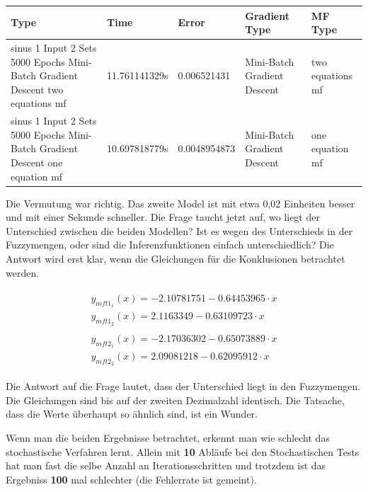 \begin{center}\label{tab2_1000MB}
	\begin{tabular}{ | p{3cm} | l | l | p{3cm} | p{3cm} |}
		\hline
		Type & Time & Error & Gradient Type & MF Type \\ \hline
		sinus 1 Input 2 Sets 5000 Epochs Mini-Batch Gradient Descent two equations mf&11.761141329s&0.006521431&Mini-Batch Gradient Descent&two equations mf \\ \hline
		sinus 1 Input 2 Sets 5000 Epochs Mini-Batch Gradient Descent one equation mf&10.697818779s&0.0048954873&Mini-Batch Gradient Descent&one equation mf \\ \hline
	\end{tabular}
\end{center}

Die Vermutung war richtig. Das zweite Model ist mit etwa 0,02 Einheiten besser und mit einer Sekunde schneller. Die Frage taucht jetzt auf, wo liegt der Unterschied zwischen die beiden Modellen? Ist es wegen des Unterschieds in der Fuzzymengen, oder sind die Inferenzfunktionen einfach unterschiedlich? Die Antwort wird erst klar, wenn die Gleichungen für die Konklusionen betrachtet werden.





\begin{align}
\begin{split}\label{2mf_0:1000}
y_{mft1_1}(x) = -2.10781751 - 0.64453965\cdot x \\
y_{mft1_2}(x) = 2.1163349 - 0.63109723\cdot x
\end{split} \\	
\begin{split}\label{2mf_1:1000}
y_{mft2_1}(x) = -2.17036302 - 0.65073889\cdot x \\
y_{mft2_2}(x) = 2.09081218 - 0.62095912\cdot x
\end{split}	
\end{align}

Die Antwort auf die Frage lautet, dass der Unterschied liegt in den Fuzzymengen. Die Gleichungen sind bis auf der zweiten Dezimalzahl identisch. Die Tatsache, dass die Werte überhaupt so ähnlich sind, ist ein Wunder.

Wenn man die beiden Ergebnisse betrachtet, erkennt man wie schlecht das stochastische Verfahren lernt. Allein mit \textbf{10} Abläufe bei den Stochastischen Tests hat man fast die selbe Anzahl an Iterationsschritten und trotzdem ist das Ergebniss \textbf{100} mal schlechter (die Fehlerrate ist gemeint).


